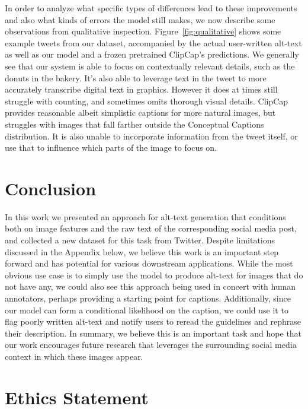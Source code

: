 \documentclass{article} %
\begin{document}
In order to analyze what specific types of differences lead to these improvements and also what kinds of errors the model still makes, we now describe some observations from qualitative inspection.
Figure~\ref{fig:qualitative} shows some example tweets from our dataset, accompanied by the actual user-written alt-text as well as our model and a frozen pretrained ClipCap's predictions.
We generally see that our system is able to focus on contextually relevant details, such as the donuts in the bakery.
It's also able to leverage text in the tweet to more accurately transcribe digital text in graphics.
However it does at times still struggle with counting, and sometimes omits thorough visual details.
ClipCap provides reasonable albeit simplistic captions for more natural images, but struggles with images that fall farther outside the Conceptual Captions distribution.
It is also unable to incorporate information from the tweet itself, or use that to influence which parts of the image to focus on.

\section{Conclusion}

In this work we presented an approach for alt-text generation that conditions both on image features and the raw text of the corresponding social media post, and collected a new dataset for this task from Twitter.
Despite limitations discussed in the Appendix below, we believe this work is an important step forward and has potential for various downstream applications.
While the most obvious use case is to simply use the model to produce alt-text for images that do not have any, we could also see this approach being used in concert with human annotators, perhaps providing a starting point for captions.
Additionally, since our model can form a conditional likelihood on the caption, we could use it to flag poorly written alt-text and notify users to reread the guidelines and rephrase their description.
In summary, we believe this is an important task and hope that our work encourages future research that leverages the surrounding social media context in which these images appear.

\section*{Ethics Statement}
\end{document}
